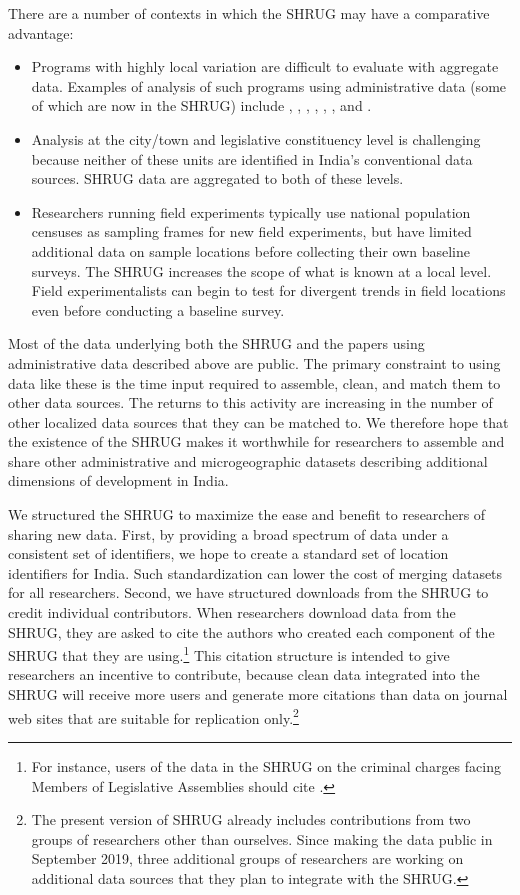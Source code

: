 \documentclass[12pt,letterpaper]{article}
\begin{document}
There are a number of contexts in which the SHRUG may have a comparative advantage:
\begin{itemize}
\item Programs with highly local variation are difficult to evaluate with aggregate data. Examples of analysis of such programs using administrative data (some of which are now in the SHRUG) include , , , , , , and .
\item Analysis at the city/town and legislative constituency level is challenging because neither of these units are identified in India's conventional data sources. SHRUG data are aggregated to both of these levels.
\item Researchers running field experiments typically use national population censuses as sampling frames for new field experiments, but have limited additional data on sample locations before collecting their own baseline surveys. The SHRUG increases the scope of what is known at a local level. Field experimentalists can begin to test for divergent trends in field locations even before conducting a baseline survey.
\end{itemize}

Most of the data underlying both the SHRUG and the papers using
administrative data described above are public. The primary constraint
to using data like these is the time input required to assemble,
clean, and match them to other data sources. The returns to this
activity are increasing in the number of other localized data sources
that they can be matched to. We therefore hope that the existence of
the SHRUG makes it worthwhile for researchers to assemble and share
other administrative and microgeographic datasets describing
additional dimensions of development in India.

We structured the SHRUG to maximize the ease and benefit to
researchers of sharing new data. First, by providing a broad spectrum
of data under a consistent set of identifiers, we hope to create a
standard set of location identifiers for India. Such standardization
can lower the cost of merging datasets for all researchers. Second, we
have structured downloads from the SHRUG to credit individual
contributors. When researchers download data from the SHRUG, they are
asked to cite the authors who created each component of the SHRUG that
they are using.\footnote{For instance, users of the data in the SHRUG
  on the criminal charges facing Members of Legislative Assemblies
  should cite .} This citation structure is
intended to give researchers an incentive to contribute, because clean
data integrated into the SHRUG will receive more users and generate
more citations than data on journal web sites that are suitable for
replication only.\footnote{The present version of SHRUG already
  includes contributions from two groups of researchers other than
  ourselves. Since making the data public in September 2019, three
  additional groups of researchers are working on additional data
  sources that they plan to integrate with the SHRUG.}
\end{document}

